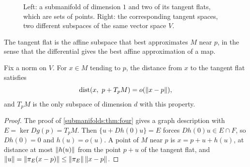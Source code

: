 \begin{notechapter}
\begin{figure}[ht]
\centering
{}
\caption{Left: a submanifold of dimension $1$ and two of its tangent
flats, which are sets of points. Right: the corresponding tangent spaces,
two different subspaces of the same vector space $V$.}
\label{submanifolds:fig:tangent}
\end{figure}

The tangent flat is the affine subspace that best approximates $M$ near
$p$, in the sense that the differential gives the best affine
approximation of a map.

\begin{proposition}\label{submanifolds:prop:contact}
Fix a norm on $V$. For $x\in M$ tending to $p$, the distance from $x$ to
the tangent flat satisfies
\[
  \operatorname{dist}(x,\ p + T_pM) = o(\left\|x - p\right\|) ,
\]
and $T_pM$ is the only subspace of dimension $d$ with this property.
\end{proposition}

\begin{proof}
The proof of \cref{submanifolds:thm:four} gives a graph description with
$E = \ker Dg(p) = T_pM$. Then $\{u + Dh(0)u\} = E$ forces
$Dh(0)u\in E\cap F$, so $Dh(0) = 0$ and $h(u) = o(u)$. A point of $M$
near $p$ is $x = p + u + h(u)$, at distance at most $\left\|h(u)\right\|$ from the
point $p + u$ of the tangent flat, and
$\left\|u\right\| = \left\|\pi_E(x - p)\right\|\leq\left\|\pi_E\right\|\left\|x - p\right\|$.


\end{proof}
\end{notechapter}
